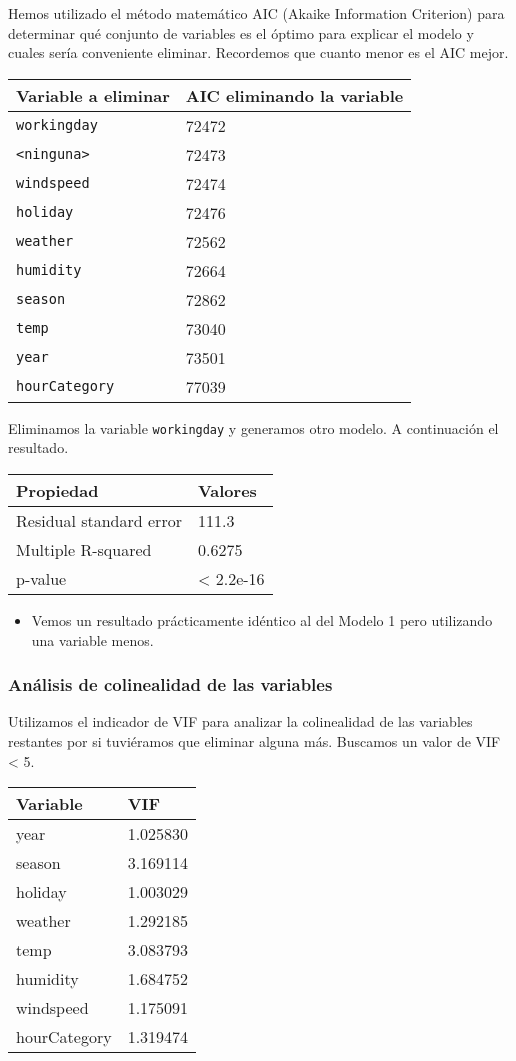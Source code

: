 \documentclass[
]{article}
\providecommand{\tightlist}{%
  \setlength{\itemsep}{0pt}\setlength{\parskip}{0pt}}
\begin{document}
Hemos utilizado el método matemático AIC (Akaike Information Criterion)
para determinar qué conjunto de variables es el óptimo para explicar el
modelo y cuales sería conveniente eliminar. Recordemos que cuanto menor
es el AIC mejor.

\begin{longtable}[]{@{}ll@{}}
\toprule
Variable a eliminar & AIC eliminando la variable\tabularnewline
\midrule
\endhead
\texttt{workingday} & 72472\tabularnewline
\texttt{\textless{}ninguna\textgreater{}} & 72473\tabularnewline
\texttt{windspeed} & 72474\tabularnewline
\texttt{holiday} & 72476\tabularnewline
\texttt{weather} & 72562\tabularnewline
\texttt{humidity} & 72664\tabularnewline
\texttt{season} & 72862\tabularnewline
\texttt{temp} & 73040\tabularnewline
\texttt{year} & 73501\tabularnewline
\texttt{hourCategory} & 77039\tabularnewline
\bottomrule
\end{longtable}

Eliminamos la variable \texttt{workingday} y generamos otro modelo. A
continuación el resultado.

\begin{longtable}[]{@{}ll@{}}
\toprule
Propiedad & Valores\tabularnewline
\midrule
\endhead
Residual standard error & 111.3\tabularnewline
Multiple R-squared & 0.6275\tabularnewline
p-value & \textless{} 2.2e-16\tabularnewline
\bottomrule
\end{longtable}

\begin{itemize}
\tightlist
\item
  Vemos un resultado prácticamente idéntico al del Modelo 1 pero
  utilizando una variable menos.
\end{itemize}

\hypertarget{anuxe1lisis-de-colinealidad-de-las-variables}{%
\subsubsection{Análisis de colinealidad de las
variables}\label{anuxe1lisis-de-colinealidad-de-las-variables}}

Utilizamos el indicador de VIF para analizar la colinealidad de las
variables restantes por si tuviéramos que eliminar alguna más. Buscamos
un valor de VIF \textless{} 5.

\begin{longtable}[]{@{}ll@{}}
\toprule
Variable & VIF\tabularnewline
\midrule
\endhead
year & 1.025830\tabularnewline
season & 3.169114\tabularnewline
holiday & 1.003029\tabularnewline
weather & 1.292185\tabularnewline
temp & 3.083793\tabularnewline
humidity & 1.684752\tabularnewline
windspeed & 1.175091\tabularnewline
hourCategory & 1.319474\tabularnewline
\bottomrule
\end{longtable}
\end{document}
